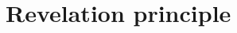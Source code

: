 \documentclass[a4paper,12pt]{article}
\begin{document}




\section{Revelation principle}
\label{sec:revelation-principle}
\end{document}
